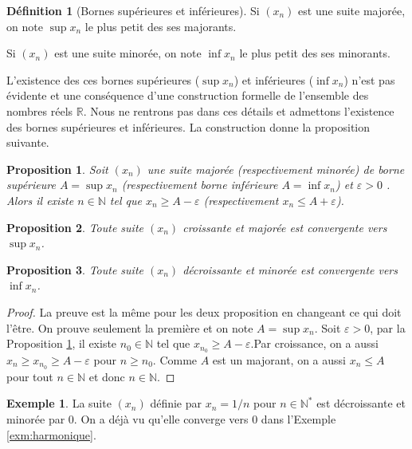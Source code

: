 \documentclass[
]{book}
\newtheorem{proposition}{Proposition}[chapter]
\theoremstyle{definition}
\newtheorem{definition}{Définition}[chapter]
\theoremstyle{definition}
\newtheorem{example}{Exemple}[chapter]
\theoremstyle{definition}
\theoremstyle{definition}
\theoremstyle{remark}
\begin{document}
\begin{definition}[Bornes supérieures et inférieures]
Si \((x_n)\) est une suite majorée, on note \(\sup x_n\) le plus petit des ses majorants.

Si \((x_n)\) est une suite minorée, on note \(\inf x_n\) le plus petit des ses minorants.
\end{definition}

L'existence des ces bornes supérieures (\(\sup x_n\)) et inférieures (\(\inf x_n\)) n'est pas évidente et une conséquence d'une construction formelle de l'ensemble des nombres réels \(\mathbb{R}\). Nous ne rentrons pas dans ces détails et admettons l'existence des bornes supérieures et inférieures. La construction donne la proposition suivante.

\begin{proposition}
\protect\hypertarget{prp:sup}{}\label{prp:sup}Soit \((x_n)\) une suite majorée (respectivement minorée) de borne supérieure \(A=\sup x_n\) (respectivement borne inférieure \(A=\inf x_n\)) et \(\varepsilon>0\) . Alors il existe \(n\in\mathbb{N}\) tel que \(x_n\geq A-\varepsilon\) (respectivement \(x_n\leq A+\varepsilon\)).
\end{proposition}

\begin{proposition}
Toute suite \((x_n)\) croissante et majorée est convergente vers \(\sup x_n\).
\end{proposition}

\begin{proposition}
Toute suite \((x_n)\) décroissante et minorée est convergente vers \(\inf x_n\).
\end{proposition}

\begin{proof}
La preuve est la même pour les deux proposition en changeant ce qui doit l'être. On prouve seulement la première et on note \(A=\sup x_n\). Soit \(\varepsilon>0\), par la Proposition \ref{prp:sup}, il existe \(n_0\in\mathbb{N}\) tel que \(x_{n_0}\geq A-\varepsilon\).Par croissance, on a aussi \(x_n\geq x_{n_0}\geq A-\varepsilon\) pour \(n\geq n_0\). Comme \(A\) est un majorant, on a aussi \(x_{n}\leq A\) pour tout \(n\in\mathbb{N}\) et donc \(n\in\mathbb{N}\).
\end{proof}

\begin{example}
La suite \((x_n)\) définie par \(x_n=1/n\) pour \(n\in\mathbb{N}^*\) est décroissante et minorée par 0. On a déjà vu qu'elle converge vers 0 dans l'Exemple \ref{exm:harmonique}.
\end{example}
\end{document}
